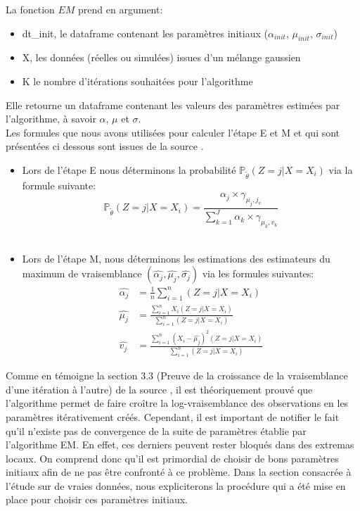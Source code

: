 \documentclass[a4paper,french,10pt]{article}
\begin{document}
La fonction $EM$ prend en argument:
\begin{itemize}
	\item dt\_init, le dataframe contenant les paramètres initiaux ($\alpha_{init}$, $\mu_{init}$, $\sigma_{init}$)
	\item X, les données (réelles ou simulées) issues d'un mélange gaussien
	\item K le nombre d'itérations souhaitées pour l'algorithme
\end{itemize}  
Elle retourne un dataframe contenant les valeurs des
paramètres estimées par l'algorithme, à savoir $\alpha$, $\mu$ et $\sigma$. \\
Les formules que nous avons utilisées pour calculer l'étape E et M et qui sont présentées ci dessous sont issues de la source \cite{EM_algorithm}.
\begin{itemize}
	\item Lors de l'étape E nous déterminons la probabilité $\mathbb{P}_{\tilde{\theta}}(Z = j| X = X_i)$ via la formule suivante:
	\[
	\mathbb{P}_{\tilde{\theta}}(Z = j| X = X_i) = \frac{\alpha_j \times \gamma_{\mu_j, j_v}}{\sum_{k=1}^{J} \alpha_k \times \gamma_{\mu_k, v_k}}
	\] \\
	\item Lors de l'étape M, nous déterminons les estimations des estimateurs du maximum de vraisemblance $(\widehat{\alpha_j}, \widehat{\mu_j}, \widehat{\sigma_j})$ via les formules suivantes:
	\begin{align*}
		\widehat{\alpha_j} &= \displaystyle\frac{1}{n}\sum_{i=1}^n (Z=j|X=X_i) \\
		\widehat{\mu_j} &= \displaystyle\frac{\displaystyle\sum_{i=1}^n X_i (Z=j|X=X_i)}{\displaystyle\sum_{i=1}^n (Z=j|X=X_i)} \\
		\widehat{v_j} &= \displaystyle\frac{\displaystyle\sum_{i=1}^n (X_i -\widehat{\mu_j})^2 (Z=j|X=X_i)}{\displaystyle\sum_{i=1}^n (Z=j|X=X_i)}
	\end{align*} 
\end{itemize}
\vspace{1mm}
Comme en témoigne la section 3.3 (Preuve de la croissance de la vraisemblance d’une itération à l’autre) de la source \cite{EM_algorithm}, il est théoriquement prouvé que l'algorithme permet de faire croître la log-vraisemblance des observations
en les paramètres itérativement créés.
Cependant, il est important de notifier le fait qu'il n'existe pas de convergence de la suite de paramètres établie par l'algorithme EM. En effet, ces derniers peuvent rester bloqués dans des extremas locaux. On comprend donc qu'il est primordial de choisir de bons paramètres initiaux afin de ne pas être confronté à ce problème. Dans la section consacrée à l'étude sur de vraies données, nous expliciterons la procédure qui a été mise en place pour choisir ces paramètres initiaux.
\end{document}
